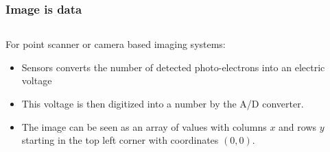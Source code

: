 \documentclass[ignorenonframetext,aspectratio=169,10pt,xcolor=table]{beamer}
\begin{document}
\begin{frame} \frametitle{Image is data}

  \begin{columns}
    \begin{column}{.5\textwidth}
      For point scanner or camera based imaging systems:
      \begin{itemize} \setlength\itemsep{1em}
      \item Sensors converts the number of detected photo-electrons
        into an electric voltage
      \item This voltage is then digitized into a number by the A/D
        converter.
      \item The image can be seen as an array of values with columns
        $x$ and rows $y$ starting in the top left corner with coordinates $(0,0)$.
      \end{itemize}
      \end{column}

    \begin{column}{.5\textwidth}
    \end{column}

  \end{columns}

\end{frame}
\end{document}
